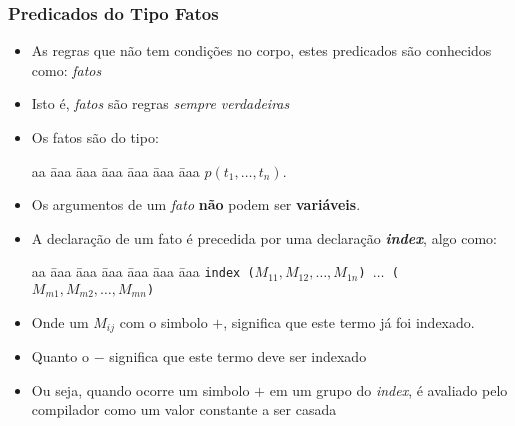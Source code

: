 
\begin{frame}[c,allowframebreaks=0.6,fragile]

\frametitle{Predicados do Tipo  Fatos}

    \begin{itemize}
        \item As regras que não tem condições no corpo, estes predicados são conhecidos
        como:  \textit{fatos}
        
                \item Isto é, \textit{fatos} são regras \textit{sempre verdadeiras}
        
        \item Os fatos são do tipo:
        
        \begin{tabbing}
          aa \= aaa \= aaa \= aaa \= aaa \= aaa \= aaa \kill
          \> \> $p(t_1,\ldots,t_n)$. 
        \end{tabbing}
        
        \item Os argumentos de um \emph{fato} \textbf{não} podem ser \textbf{variáveis}.
        
        \framebreak
        
        \item A declaração de um fato é precedida por uma declaração \textbf{\emph{index}},
        algo como:
        
        \begin{tabbing}
        aa \= aaa \= aaa \= aaa \= aaa \= aaa \= aaa \kill
            \> \texttt{index ($M_{11},M_{12},\ldots,M_{1n}$) $\ldots$ ($M_{m1},M_{m2},\ldots,M_{mn}$)} 
        \end{tabbing}
        
        \item Onde um $M_{ij}$ com o simbolo $+$,  significa que este termo já foi 
        indexado.
        
        \item Quanto o $-$ significa que este termo deve ser indexado
        
        \item Ou seja, quando ocorre um simbolo $+$ em um grupo do \textit{index}, é avaliado
        pelo compilador como um valor constante a ser casada
        
        

\end{itemize}
\end{frame}
